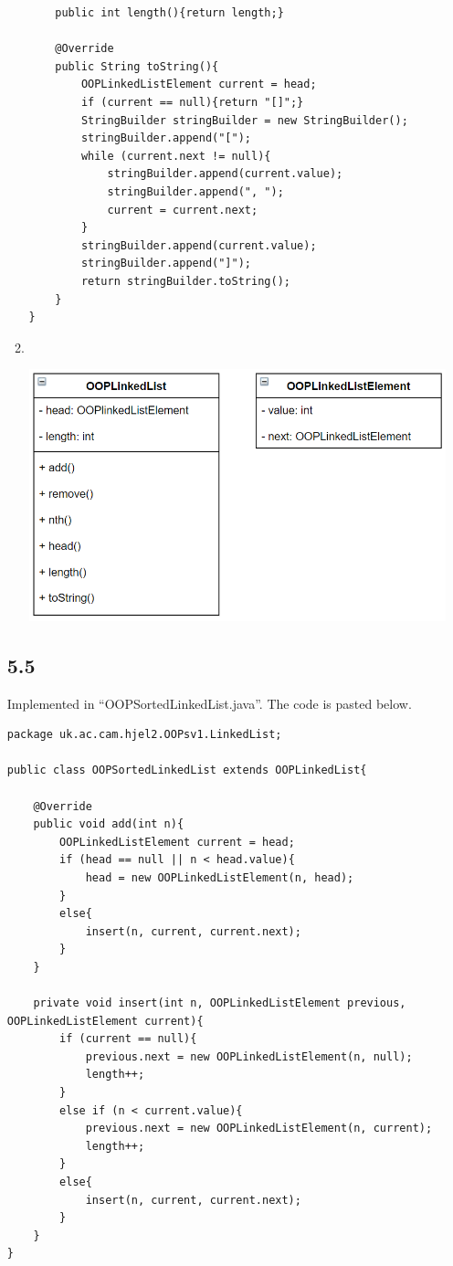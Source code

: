 \documentclass[10pt,\jkfside,a4paper]{article}
\begin{document}
\begin{enumerate}
\begin{enumerate}[label=(\alph*)]
\begin{verbatim}
    public int length(){return length;}

    @Override
    public String toString(){
        OOPLinkedListElement current = head;
        if (current == null){return "[]";}
        StringBuilder stringBuilder = new StringBuilder();
        stringBuilder.append("[");
        while (current.next != null){
            stringBuilder.append(current.value);
            stringBuilder.append(", ");
            current = current.next;
        }
        stringBuilder.append(current.value);
        stringBuilder.append("]");
        return stringBuilder.toString();
    }
}
\end{verbatim}

\item \textcolor{white}{ }\\
\begin{center}
\includegraphics[scale=0.7]{UMLdiagram}
\end{center}
\end{enumerate}

\subsection*{5.5}
Implemented in ``OOPSortedLinkedList.java''. The code is pasted below.

\begin{verbatim}
package uk.ac.cam.hjel2.OOPsv1.LinkedList;

public class OOPSortedLinkedList extends OOPLinkedList{

    @Override
    public void add(int n){
        OOPLinkedListElement current = head;
        if (head == null || n < head.value){
            head = new OOPLinkedListElement(n, head);
        }
        else{
            insert(n, current, current.next);
        }
    }
	
    private void insert(int n, OOPLinkedListElement previous, OOPLinkedListElement current){
        if (current == null){
            previous.next = new OOPLinkedListElement(n, null);
            length++;
        }
        else if (n < current.value){
            previous.next = new OOPLinkedListElement(n, current);
            length++;
        }
        else{
            insert(n, current, current.next);
        }
    }
}
\end{verbatim}

\end{enumerate}
\end{document}
